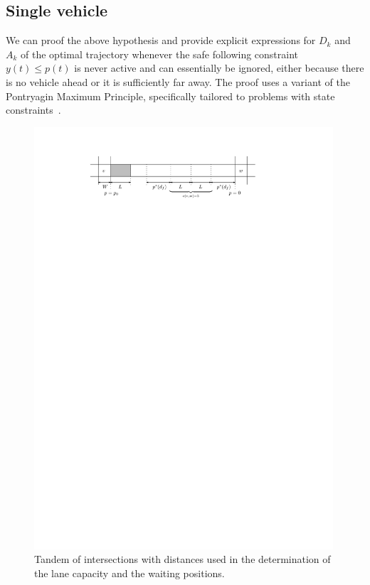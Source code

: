 \documentclass[a4paper]{article}
\theoremstyle{definition}
\theoremstyle{plain}
\begin{document}
\subsection{Single vehicle}

We can proof the above hypothesis and provide explicit expressions for $D_{k}$
and $A_{k}$ of the optimal trajectory whenever the safe following constraint
$y(t) \leq p(t)$ is never active and can essentially be ignored, either because
there is no vehicle ahead or it is sufficiently far away.
%
The proof uses a variant of the Pontryagin Maximum Principle, specifically
tailored to problems with state
constraints~\cite{hartlSurveyMaximumPrinciples1995}.

\newpage

\begin{figure}
  \centering
  \includegraphics[width=0.99\textwidth]{figures/motion/tandem_annotated}
  \caption{Tandem of intersections with distances used in the determination of
    the lane capacity and the waiting positions.}
  \label{fig:tandem_annotated}
\end{figure}
\end{document}
